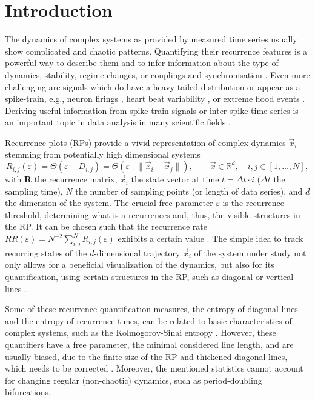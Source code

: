 \documentclass[entropy,article,submit,pdftex,moreauthors]{Definitions/mdpi}
\begin{document}
\section{Introduction}\label{sec_tau_rr_intro}

The dynamics of complex systems as provided by measured time series usually show complicated and chaotic patterns.
Quantifying their recurrence features is a powerful way to describe them and to infer information about 
the type of dynamics, stability, regime changes, or couplings and synchronisation \cite{marwan2007,marwan2008epjst,webber2015}.
Even more challenging are signals which do have a heavy tailed-distribution or appear as a spike-train,
e.g., neuron firings \cite{Dummer2014,Orcioni2020}, heart beat variability \cite{marwan2002herz}, 
or extreme flood events \cite{banerjee2021}.
Deriving useful information from spike-train signals or inter-spike time series is an important
topic in data analysis in many scientific fields \cite{Kajikawa2005,Dummer2014,Orcioni2020,Canale2021}.

Recurrence plots (RPs) provide a vivid representation of complex dynamics $\vec{x}_i$ stemming from potentially high dimensional systems \cite{marwan2007}
\begin{equation}\label{eq_rp_definition}
R_{i,j}(\varepsilon) = \Theta\left(\varepsilon - D_{i,j}\right) 
= \Theta\left(\varepsilon - \| \vec{x}_i - \vec{x}_j\|\right), \qquad \vec{x} \in \mathbb{R}^d, \quad i,j \in [1,\ldots, N],
\end{equation}
with $\mathbf{R}$ the recurrence matrix, $\vec{x}_i$ the state vector at time 
$t = \Delta t \cdot i$ ($\Delta t$ the sampling time), $N$ the number of
sampling points (or length of data series), and $d$ the dimension of the system.
The crucial free parameter $\varepsilon$ is the recurrence threshold, determining what is a recurrences
and, thus, the visible structures in the RP. It can be chosen such that the recurrence rate 
$RR(\varepsilon)=N^{-2}\sum_{i,j}^N R_{i,j}(\varepsilon)$ exhibits a certain value \cite{kraemer2018}.
The simple idea to track recurring states of the $d$-dimensional trajectory $\vec{x}_i$ of the system under study not only allows for a beneficial visualization of the dynamics, 
but also for its 
quantification, using certain structures in the RP, such as diagonal or vertical lines \cite{marwan2007}. 

Some of these recurrence quantification measures, the entropy of diagonal lines and the entropy of 
recurrence times, can be related to basic characteristics of complex systems, such as the Kolmogorov-Sinai entropy \cite{march2005,baptista2010}. However, these quantifiers have a free parameter, the minimal considered line length, and 
are usually biased, due to the finite size of the RP and thickened diagonal lines, which needs to be corrected \cite{Kraemer2019}. Moreover, the mentioned statistics cannot account for 
changing regular (non-chaotic) dynamics, such as period-doubling bifurcations.
\end{document}
